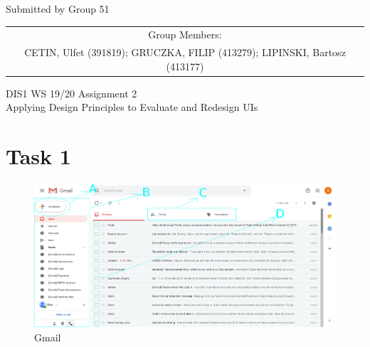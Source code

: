 \documentclass[a4paper,11pt,oneside]{scrreprt}
\begin{document}
\begin{center}
	Submitted by Group 51
	
	\bigskip
	
	\begin{tabular}{c}
	Group Members: \\
	CETIN, Ulfet (391819); GRUCZKA, FILIP (413279);	LIPINSKI, Bartosz (413177) \\
	\end{tabular}

	\bigskip
	
	DIS1 WS 19/20 Assignment 2\\
	Applying Design Principles to Evaluate and Redesign UIs
	
\end{center}

\section*{Task 1}

%


\begin{figure}[H]
	\centering
	\includegraphics[clip, trim=0cm 1cm 0cm 0cm, scale=0.33]{./images/gmail1.png}
	\caption{Gmail}
	\label{fig:sub2}
\end{figure}
\end{document}
